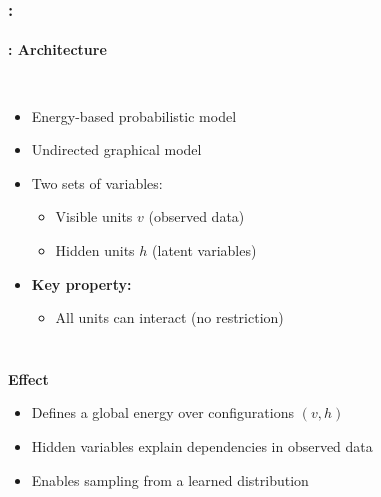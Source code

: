 \documentclass[xcolor=table]{beamer}
\begin{document}
	\begin{frame}
		\frametitle{\insertshortsubtitle: \insertsection}
		\framesubtitle{\insertsubsection: Architecture}
		
		\begin{columns}
			
			\begin{itemize}
				\item Energy-based probabilistic model
				\item Undirected graphical model
				\item Two sets of variables:
				\begin{itemize}
					\item Visible units $v$ (observed data)
					\item Hidden units $h$ (latent variables)
				\end{itemize}
				\item \textbf{Key property:}
				\begin{itemize}
					\item All units can interact (no restriction)
				\end{itemize}
			\end{itemize}
			
		\end{columns}
		
		\textbf{Effect}
		\begin{itemize}
			\item Defines a global energy over configurations $(v,h)$
			\item Hidden variables explain dependencies in observed data
			\item Enables sampling from a learned distribution
		\end{itemize}
		
	\end{frame}
	
\end{document}
